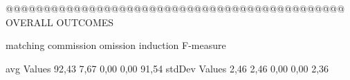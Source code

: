  @@@@@@@@@@@@@@@@@@@@@@@@@@@@@@@@@@@@@@@@@@@@@ OVERALL OUTCOMES

                matching commission   omission  induction   F-measure

avg Values      92,43       7,67       0,00       0,00       91,54        
stdDev Values    2,46       2,46       0,00       0,00        2,36        
